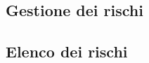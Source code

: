 \documentclass[../piano-di-progetto.tex]{subfiles}
\begin{document}
	\subsection{Gestione dei rischi}
  \label{subsec:gestione_dei_rischi}

  \subsection{Elenco dei rischi}
  \label{subsec:elenco_dei_rischi}

  
\end{document}
